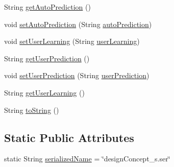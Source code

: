 \begin{DoxyCompactItemize}
String \hyperlink{classit_1_1isislab_1_1masonhelperdocumentation_1_1_o_d_d_1_1_design_concepts_a266ecb29b4c1de8e7d59692b09463c59}{get\-Auto\-Prediction} ()
\item 
void \hyperlink{classit_1_1isislab_1_1masonhelperdocumentation_1_1_o_d_d_1_1_design_concepts_adffe83b119875f2188374e6566d5cc30}{set\-Auto\-Prediction} (String \hyperlink{classit_1_1isislab_1_1masonhelperdocumentation_1_1_o_d_d_1_1_design_concepts_a0fa295c94a753727d37958f540504870}{auto\-Prediction})
\item 
void \hyperlink{classit_1_1isislab_1_1masonhelperdocumentation_1_1_o_d_d_1_1_design_concepts_a38cfa461985c50771001b5449ea303c9}{set\-User\-Learning} (String \hyperlink{classit_1_1isislab_1_1masonhelperdocumentation_1_1_o_d_d_1_1_design_concepts_a99d80f9502c09ab90d0d13ccb60be6c4}{user\-Learning})
\item 
String \hyperlink{classit_1_1isislab_1_1masonhelperdocumentation_1_1_o_d_d_1_1_design_concepts_a61fd3913e11fee85f390d52831ee63ea}{get\-User\-Prediction} ()
\item 
void \hyperlink{classit_1_1isislab_1_1masonhelperdocumentation_1_1_o_d_d_1_1_design_concepts_a4c992e77f90c8356f7043a2b706ecf81}{set\-User\-Prediction} (String \hyperlink{classit_1_1isislab_1_1masonhelperdocumentation_1_1_o_d_d_1_1_design_concepts_a753b8ac81cc11fb07e248cebadcc7494}{user\-Prediction})
\item 
String \hyperlink{classit_1_1isislab_1_1masonhelperdocumentation_1_1_o_d_d_1_1_design_concepts_ab3d2b25545a723f677cf54548fc17ae2}{get\-User\-Learning} ()
\item 
String \hyperlink{classit_1_1isislab_1_1masonhelperdocumentation_1_1_o_d_d_1_1_design_concepts_a77f77282f4f064e0bf3c80c6bf47c7ce}{to\-String} ()
\end{DoxyCompactItemize}
\subsection*{Static Public Attributes}
\begin{DoxyCompactItemize}
\item 
static String \hyperlink{classit_1_1isislab_1_1masonhelperdocumentation_1_1_o_d_d_1_1_design_concepts_aea4dd70b41f24245da5d1dd04bba4da3}{serialized\-Name} = \char`\"{}design\-Concept\-\_\-s.\-ser\char`\"{}
\end{DoxyCompactItemize}
